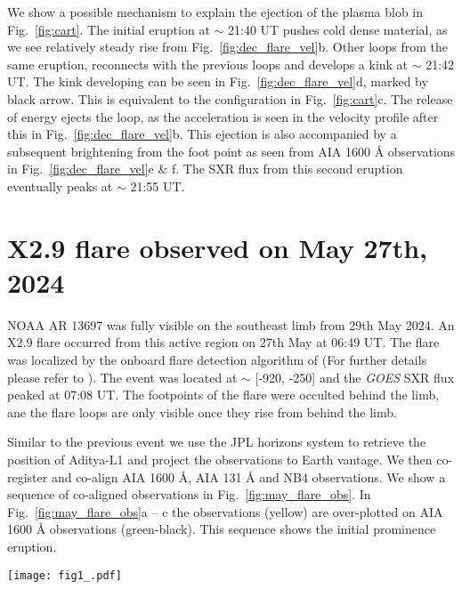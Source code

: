 We show a possible mechanism to explain the ejection of the plasma blob in Fig.~\ref{fig:cart}. The initial eruption at $\sim$ 21:40 UT pushes cold dense material, as we see relatively steady rise from Fig.~\ref{fig:dec_flare_vel}b. Other loops from the same eruption, reconnects with the previous loops and develops a kink at $\sim$ 21:42 UT. The kink developing can be seen in Fig.~\ref{fig:dec_flare_vel}d, marked by black arrow. This is equivalent to the configuration in Fig.~\ref{fig:cart}c. The release of energy ejects the loop, as the acceleration is seen in the velocity profile after this in Fig.~\ref{fig:dec_flare_vel}b. This ejection is also accompanied by a subsequent brightening from the foot point as seen from AIA 1600 {\AA} observations in Fig.~\ref{fig:dec_flare_vel}e \& f. The SXR flux from this second eruption eventually peaks at $\sim$ 21:55 UT.

\section{X2.9 flare observed on May 27th, 2024} \label{sec:dec_31st}

NOAA AR 13697 was fully visible on the southeast limb from 29th May 2024. An X2.9 flare occurred from this active region on 27th May at 06:49 UT. The flare was localized by the onboard flare detection algorithm of {\suit} (For further details please refer to \citep{flare_det}). The event was located at $\sim$ [-920{\arcsec}, -250{\arcsec}] and the {\it GOES} SXR flux peaked at 07:08 UT. The footpoints of the flare were occulted behind the limb, ane the flare loops are only visible once they rise from behind the limb. 

Similar to the previous event we use the JPL horizons system to retrieve the position of Aditya-L1 and project the observations to Earth vantage. We then co-register and co-align AIA 1600 {\AA}, AIA 131 {\AA} and {\suit} NB4 observations. We show a sequence of co-aligned observations in Fig.~\ref{fig:may_flare_obs}. In Fig.~\ref{fig:may_flare_obs}a {--} c the {\suit} observations (yellow) are over-plotted on AIA 1600 {\AA} observations (green-black). This sequence shows the initial prominence eruption.

\begin{figure*}[ht!]
    \centering
    \texttt{[image: fig1\_.pdf]}
    \caption{(a) {--} (c) Sequence of AIA 1600 {\AA} (black-green) observations coaligned with {\suit} NB3 (yellow) observations.}
    \label{fig:may_flare_obs}
\end{figure*}

